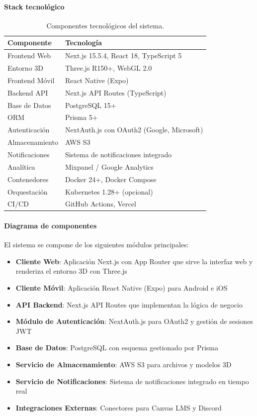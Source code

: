 \paragraph{Stack tecnológico}

\begin{table}[H]
	\centering
	\caption{Componentes tecnológicos del sistema.}
	\begin{tabular}{p{4cm} p{9cm}}
		\toprule
		Componente & Tecnología \\
		\midrule
		Frontend Web & Next.js 15.5.4, React 18, TypeScript 5 \\
		Entorno 3D & Three.js R150+, WebGL 2.0 \\
		Frontend Móvil & React Native (Expo) \\
		Backend API & Next.js API Routes (TypeScript) \\
		Base de Datos & PostgreSQL 15+ \\
		ORM & Prisma 5+ \\
		Autenticación & NextAuth.js con OAuth2 (Google, Microsoft) \\
		Almacenamiento & AWS S3 \\
		Notificaciones & Sistema de notificaciones integrado \\
		Analítica & Mixpanel / Google Analytics \\
		Contenedores & Docker 24+, Docker Compose \\
		Orquestación & Kubernetes 1.28+ (opcional) \\
		CI/CD & GitHub Actions, Vercel \\
		\bottomrule
	\end{tabular}
\end{table}

\paragraph{Diagrama de componentes}

El sistema se compone de los siguientes módulos principales:

\begin{itemize}
	\item \textbf{Cliente Web}: Aplicación Next.js con App Router que sirve la interfaz web y renderiza el entorno 3D con Three.js
	\item \textbf{Cliente Móvil}: Aplicación React Native (Expo) para Android e iOS
	\item \textbf{API Backend}: Next.js API Routes que implementan la lógica de negocio
	\item \textbf{Módulo de Autenticación}: NextAuth.js para OAuth2 y gestión de sesiones JWT
	\item \textbf{Base de Datos}: PostgreSQL con esquema gestionado por Prisma
	\item \textbf{Servicio de Almacenamiento}: AWS S3 para archivos y modelos 3D
	\item \textbf{Servicio de Notificaciones}: Sistema de notificaciones integrado en tiempo real
	\item \textbf{Integraciones Externas}: Conectores para Canvas LMS y Discord
\end{itemize}

